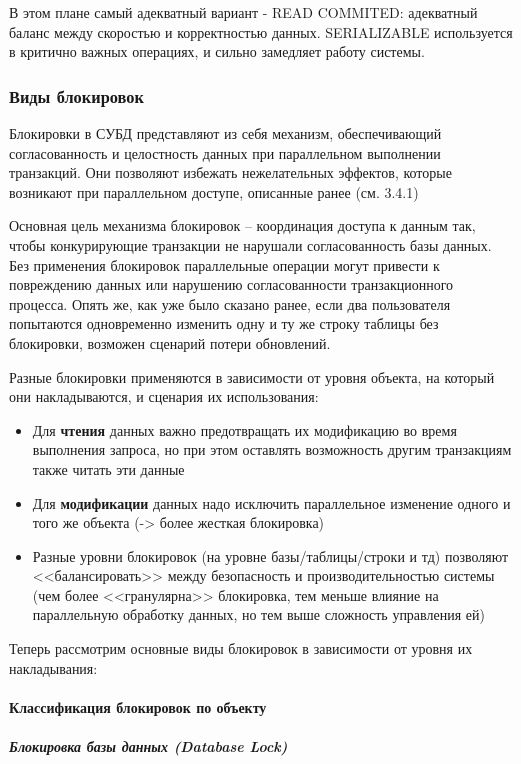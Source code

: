  В этом плане самый адекватный вариант - READ COMMITED: адекватный баланс между скоростью и корректностью данных. SERIALIZABLE используется в критично важных операциях, и сильно замедляет работу системы.
 
 \subsubsection{Виды блокировок}
 
 Блокировки в СУБД представляют из себя механизм, обеспечивающий согласованность и целостность данных при параллельном выполнении транзакций. Они позволяют избежать нежелательных эффектов, которые возникают при параллельном доступе, описанные ранее (см. 3.4.1)
 
 Основная цель механизма блокировок – координация доступа к данным так, чтобы конкурирующие транзакции не нарушали согласованность базы данных. Без применения блокировок параллельные операции могут привести к повреждению данных или нарушению согласованности транзакционного процесса. Опять же, как уже было сказано ранее, если два пользователя попытаются одновременно изменить одну и ту же строку таблицы без блокировки, возможен сценарий потери обновлений.
 
 Разные блокировки применяются в зависимости от уровня объекта, на который они накладываются, и сценария их использования:
 
 \begin{itemize}
     \item Для \textbf{чтения} данных важно предотвращать их модификацию во время выполнения запроса, но при этом оставлять возможность другим транзакциям также читать эти данные
     \item Для \textbf{модификации} данных надо исключить параллельное изменение одного и того же объекта (-> более жесткая блокировка)
     \item Разные уровни блокировок (на уровне базы/таблицы/строки и тд) позволяют <<балансировать>> между безопасность и производительностью системы (чем более <<гранулярна>> блокировка, тем меньше влияние на параллельную обработку данных, но тем выше сложность управления ей) \autocite[ch.22]{ElmasriNavathe}
 \end{itemize}
 
 Теперь рассмотрим основные виды блокировок в зависимости от уровня их накладывания:
 
 \paragraph{Классификация блокировок по объекту}
 \subparagraph{Блокировка базы данных (Database Lock)} ~\\

